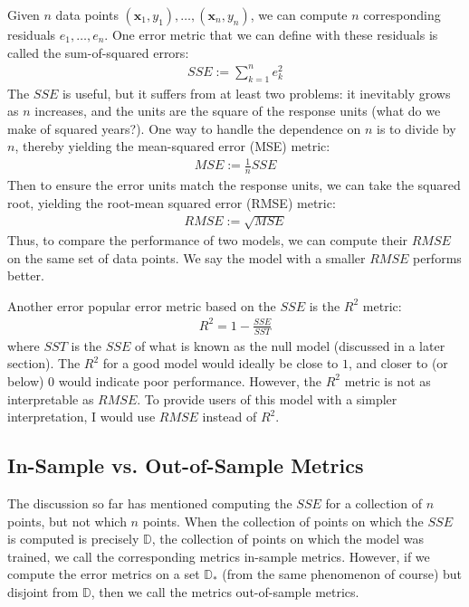 \documentclass[12pt]{article}
\begin{document}
	Given $n$ data points $(\bm{x}_1,y_1),\ldots,(\bm{x}_n,y_n)$, we can
	compute $n$ corresponding residuals $e_1,\ldots,e_n$. One error metric
	that we can define with these residuals is called the sum-of-squared errors:
	\begin{align*}
		SSE := \sum_{k=1}^{n}e_k^2
	\end{align*}
	The $SSE$ is useful, but it suffers from at least two problems: it
	inevitably grows as $n$ increases, and the units are the square of
	the response units (what do we make of squared years?). One way to
	handle the dependence on $n$ is to divide by $n$, thereby yielding
	the mean-squared error (MSE) metric:
	\begin{align*}
		MSE := \frac{1}{n}SSE
	\end{align*}
	Then to ensure the error units match the response units, we can take
	the squared root, yielding the root-mean squared error (RMSE) metric:
	\begin{align*}
		RMSE := \sqrt{MSE}
	\end{align*}
	Thus, to compare the performance of two models, we can compute their
	$RMSE$ on the same set of data points. We say the model with a smaller
	$RMSE$ performs better.
	
	Another error popular error metric based on the $SSE$ is the $R^2$ metric:
	\begin{align*}
		R^2 = 1 - \frac{SSE}{SST}
	\end{align*}
	where $SST$ is the $SSE$ of what is known as the null model (discussed
	in a later section). The $R^2$ for a good model would ideally be
	close to $1$, and closer to (or below) $0$ would indicate poor
	performance. However, the $R^2$ metric is not as interpretable
	as $RMSE$. To provide users of this model with a simpler interpretation,
	I would use $RMSE$ instead of $R^2$.
	
	\subsection{In-Sample vs. Out-of-Sample Metrics}
	
	The discussion so far has mentioned computing the $SSE$ for a collection
	of $n$ points, but not which $n$ points. When the collection of points
	on which the $SSE$ is computed is precisely $\mathbb{D}$, the collection
	of points on which the model was trained, we call the corresponding
	metrics in-sample metrics. However, if we compute the error metrics on
	a set $\mathbb{D}_*$ (from the same phenomenon of course) but disjoint from
	$\mathbb{D}$, then we call the metrics out-of-sample metrics.
	
\end{document}
